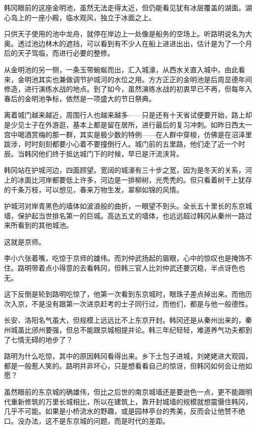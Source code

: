韩冈眼前的这座金明池，虽然无法走得太近，但仍能看见犹有冰层覆盖的湖面。湖心岛上的一座小殿，临水观风，独立于冰面之上。

只供天子使用的池中龙舟，就停在岸边上一处像是船务的空场上。听路明说名为大奥。透过池边林木的遮挡，可以看到有不少人在船上进进出出，估计是为了一个月后的天子驾临，而进行必要的整修。

从金明池的另一侧，一条玉带蜿蜒而出，汇入城濠，从西水关直入城中。由此看来，金明池其实也兼做调节护城河的水位之用。方方正正的金明池是后周显德年间修造，进行演练水战的地点。到了如今，虽然演练水战的初衷早已不再，但每年入春后的金明池争标，依然是一项盛大的节日祭典。

离着城门越来越近，周围行人也越来越多——只是还有十天省试便要开始，路上却是少见士子在外游逛，基本上都是留在居所，进行最后的复习冲刺。如昨日西太一宫中喝酒赏梅的那一群，其实是极少数的特例——在人群中穿梭，仿佛是在沼泽里跋涉，时时刻刻都要小心着不要撞倒行人。城门前的五里路，他们走了近一个时辰。当韩冈他们终于抵达城门下的时候，早已是汗流浃背。

韩冈站在护城河边，四面顾望。宽阔的城濠有三十步之宽，因为是冬天的关系，河上的冰面比河岸都要低上许多，河边是一排柳树，光秃秃的。但只看着树干上犹存的千条万枝，可以想见，春来万物生发，翠柳如锦的风情。

护城河对岸青黑色的墙体如波浪般的曲折，一眼望不到头。全长五十里长的东京城墙，保护起当世排名第一的巨城。高达五丈的墙体，也远远超过韩冈从秦州一路过来所看到的其他城池。

这就是京师。

李小六张着嘴，吃惊于京师的雄伟。而刘仲武扬起的眉眼，心中的惊叹也是掩饰不住。路明带着点小得意的去看韩冈，但韩三官人比刘仲武还要沉稳，半点讶色也无。

这下反倒是轮到路明吃惊了，他第一次看到东京城时，眼珠子差点掉出来。而他历次入京，不是没有跟第一次进京赶考的士子同行过，而他们，都是与他一般德性。

长安、洛阳名气虽大，但规模上远远比不上东京开封。韩冈还是从秦州出来的，秦州城虽比邠州要强，但总不能跟京城相提并论。韩三年纪轻轻，难道养气功夫都到了七情无碍的地步了？

路明为什么吃惊，其中的原因韩冈看得出来。乡下土包子进城，刘姥姥进大观园，都是一般惹人笑的。路明并非坏心，只是想看看自己的惊讶，但韩冈如何会让他如愿？

虽然眼前的东京城的确雄伟，但比之后世的南京城墙还是要逊色一点，更不能跟明代重新修筑的万里长城相比，所以在建筑上，靠开封城墙的规模就想震慑住韩冈，几乎不可能。如果是小桥流水的野趣，或是园林亭台的秀美，反而会让他赞不绝口。没办法，这不是东京城的问题，而是时代的差距。


